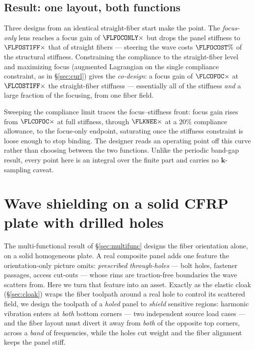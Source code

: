 \documentclass[11pt]{article}
\begin{document}
\subsection{Result: one layout, both functions}
Three designs from an identical straight-fiber start make the point. The
\emph{focus-only} lens reaches a focus gain of
$\FLFOCONLY\times$ but drops the panel stiffness to $\FLFOSTIFF\times$ that of
straight fibers --- steering the wave costs $\FLFOCOST\%$ of the structural
stiffness. Constraining the compliance to the straight-fiber level and
maximizing focus (augmented Lagrangian on the single compliance constraint,
 as in \S\ref{sec:curl}) gives the
\emph{co-design}: a focus gain of $\FLCOFOC\times$ at $\FLCOSTIFF\times$ the
straight-fiber stiffness --- essentially all of the stiffness \emph{and} a large
fraction of the focusing, from one fiber field.

Sweeping the compliance limit traces the focus--stiffness front:
focus gain rises from $\FLCOFOC\times$
at full stiffness, through $\FLKNEE\times$ at a $20\%$ compliance allowance, to
the focus-only endpoint, saturating once the stiffness constraint is loose enough
to stop binding. The designer reads an operating point off this curve rather than
choosing between the two functions. Unlike the periodic band-gap result, every
point here is an integral over the finite part and carries no $\mathbf k$-sampling
caveat.

\section{Wave shielding on a solid CFRP plate with drilled holes}
\label{sec:codesign}
The multi-functional result of \S\ref{sec:multifunc} designs the fiber orientation
alone, on a solid homogeneous plate. A real composite panel adds one feature the
orientation-only picture omits: \emph{prescribed through-holes} --- bolt holes,
fastener passages, access cut-outs --- whose rims are traction-free boundaries the
wave scatters from. Here we turn that feature into an asset. Exactly as the elastic
cloak (\S\ref{sec:cloak}) wraps the fiber toolpath around a real hole to control its
scattered field, we design the toolpath of a \emph{holed} panel to \emph{shield}
sensitive regions: harmonic vibration enters at \emph{both} bottom corners --- two
independent source load cases --- and the fiber layout must divert it away from
\emph{both} of the opposite top corners, across a \emph{band} of frequencies, while
the holes cut weight and the fiber alignment keeps the panel stiff.
\end{document}
